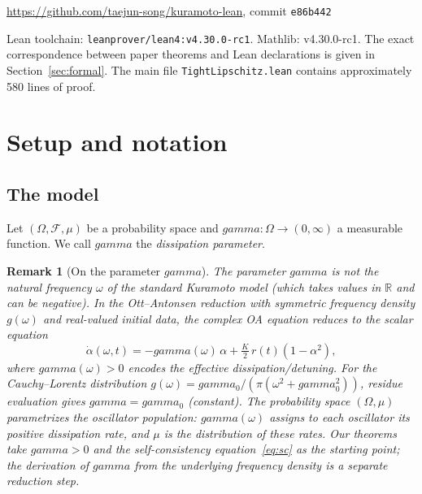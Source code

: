 \documentclass[11pt,a4paper]{article}
\let\gamma\relax\def\gamma{gamma}%
\newtheorem{remark}[theorem]{Remark}
\theoremstyle{definition}
\newcommand{\R}{\mathbb{R}}
\begin{document}
\begin{center}
\url{https://github.com/taejun-song/kuramoto-lean}, \quad commit \texttt{e86b442}
\end{center}

\noindent Lean toolchain: \texttt{leanprover/lean4:v4.30.0-rc1}. Mathlib: v4.30.0-rc1. The exact correspondence between paper theorems and Lean declarations is given in Section~\ref{sec:formal}. The main file \texttt{TightLipschitz.lean} contains approximately 580 lines of proof.

\section{Setup and notation}\label{sec:setup}

\subsection{The model}

Let $(\Omega, \mathcal{F}, \mu)$ be a probability space and $\gamma : \Omega \to (0,\infty)$ a measurable function. We call $\gamma$ the \emph{dissipation parameter}.

\begin{remark}[On the parameter $\gamma$]\label{rem:gamma}
The parameter $\gamma$ is \emph{not} the natural frequency $\omega$ of the standard Kuramoto model (which takes values in $\R$ and can be negative). In the Ott--Antonsen reduction with symmetric frequency density $g(\omega)$ and real-valued initial data, the complex OA equation reduces to the scalar equation
\begin{equation}\label{eq:oa-scalar}
\dot\alpha(\omega, t) = -\gamma(\omega)\,\alpha + \tfrac{K}{2}\,r(t)(1 - \alpha^2),
\end{equation}
where $\gamma(\omega) > 0$ encodes the effective dissipation/detuning. For the Cauchy--Lorentz distribution $g(\omega) = \gamma_0/(\pi(\omega^2 + \gamma_0^2))$, residue evaluation gives $\gamma = \gamma_0$ (constant). The probability space $(\Omega, \mu)$ parametrizes the oscillator population: $\gamma(\omega)$ assigns to each oscillator its positive dissipation rate, and $\mu$ is the distribution of these rates. Our theorems take $\gamma > 0$ and the self-consistency equation~\eqref{eq:sc} as the starting point; the derivation of $\gamma$ from the underlying frequency density is a separate reduction step.
\end{remark}
\end{document}
